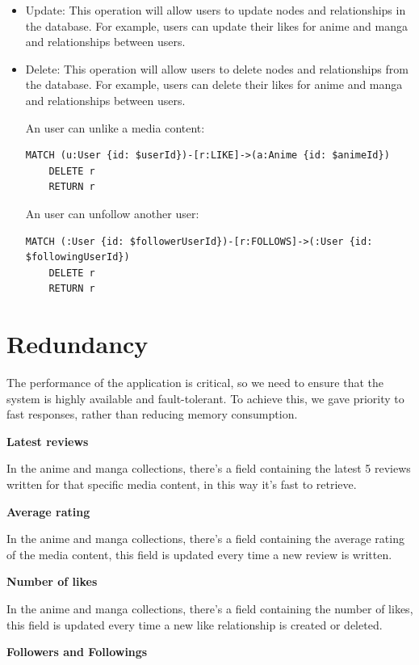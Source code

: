 \begin{itemize}
    \item Update: This operation will allow users to update nodes and relationships in the database. For example, users can update their likes for anime and manga and relationships between users.
    
    \item Delete: This operation will allow users to delete nodes and relationships from the database. For example, users can delete their likes for anime and manga and relationships between users.
    
    An user can unlike a media content:
    \begin{lstlisting}[language=Cypher, caption=Delete Like Relationship]
    MATCH (u:User {id: $userId})-[r:LIKE]->(a:Anime {id: $animeId})
    DELETE r
    RETURN r
    \end{lstlisting}
    \newpage
    An user can unfollow another user: 
    \begin{lstlisting}[language=Cypher, caption=Delete Follow Relationship]
    MATCH (:User {id: $followerUserId})-[r:FOLLOWS]->(:User {id: $followingUserId})
    DELETE r 
    RETURN r
    \end{lstlisting}
\end{itemize}

\section{Redundancy}
The performance of the application is critical, so we need to ensure that the system is highly available and fault-tolerant. To achieve this, we gave priority to fast responses, rather than reducing memory consumption.


\textbf{Latest reviews}


In the anime and manga collections, there's a field containing the latest 5 reviews written for that specific media content, in this way it's fast to retrieve. 


\textbf{Average rating}


In the anime and manga collections, there's a field containing the average rating of the media content, this field is updated every time a new review is written.


\textbf{Number of likes}


In the anime and manga collections, there's a field containing the number of likes, this field is updated every time a new like relationship is created or deleted.


\textbf{Followers and Followings}


